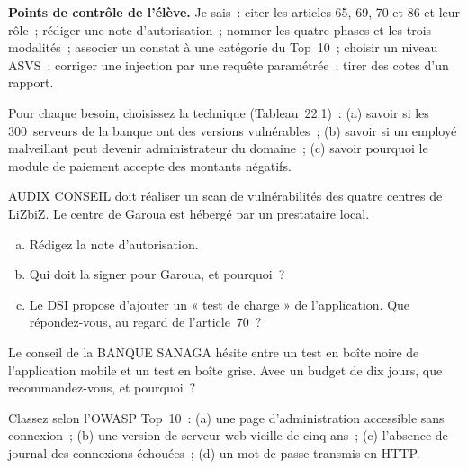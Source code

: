 \begin{boxinfo}
\textbf{Points de contrôle de l'élève.} Je sais~: citer les articles 65,
69, 70 et 86 et leur rôle~; rédiger une note d'autorisation~; nommer les
quatre phases et les trois modalités~; associer un constat à une catégorie
du Top~10~; choisir un niveau ASVS~; corriger une injection par une
requête paramétrée~; tirer des cotes d'un rapport.
\end{boxinfo}

\bigskip

\begin{boxexo}[title={\ding{45}\quad Exercice~22.1. Quelle technique~? \niveaubase}]
Pour chaque besoin, choisissez la technique (Tableau~22.1)~: (a) savoir si
les 300~serveurs de la banque ont des versions vulnérables~; (b) savoir si
un employé malveillant peut devenir administrateur du domaine~; (c) savoir
pourquoi le module de paiement accepte des montants négatifs.
\end{boxexo}

\begin{boxexo}[title={\ding{45}\quad Exercice~22.2. La note d'autorisation \niveaumoyen}]
AUDIX CONSEIL doit réaliser un scan de vulnérabilités des quatre centres de
LiZbiZ. Le centre de Garoua est hébergé par un prestataire local.
\begin{enumerate}[(a)]
    \item Rédigez la note d'autorisation.
    \item Qui doit la signer pour Garoua, et pourquoi~?
    \item Le DSI propose d'ajouter un « test de charge » de l'application.
          Que répondez-vous, au regard de l'article~70~?
\end{enumerate}
\end{boxexo}

\begin{boxexo}[title={\ding{45}\quad Exercice~22.3. Boîte noire ou grise~? \niveaubase}]
Le conseil de la BANQUE SANAGA hésite entre un test en boîte noire de
l'application mobile et un test en boîte grise. Avec un budget de dix
jours, que recommandez-vous, et pourquoi~?
\end{boxexo}

\begin{boxexo}[title={\ding{45}\quad Exercice~22.4. Classer selon le Top 10 \niveaubase}]
Classez selon l'OWASP Top~10~: (a) une page d'administration accessible sans
connexion~; (b) une version de serveur web vieille de cinq ans~; (c)
l'absence de journal des connexions échouées~; (d) un mot de passe
transmis en HTTP.
\end{boxexo}

